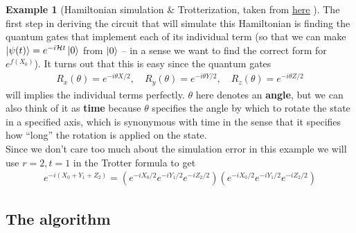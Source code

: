 \documentclass{book}
\theoremstyle{definition}
\newtheorem{exmp}{Example}[section]
\newcommand{\had}{\mathcal{H}}
\newcommand{\lp}{\left(}
\newcommand{\rp}{\right)}
\begin{document}
\begin{exmp}[Hamiltonian simulation \& Trotterization, taken from \href{https://vtomole.com/blog/2019/04/07/trotter}{\underline{here}} ]
	The first step in deriving the circuit that will simulate this Hamiltonian is finding the quantum gates that implement each of its individual term (so that we can make $\ket{\psi(t)}= e^{-i\had t}\ket{0}$ from $\ket{0}$ -- in a sense we want to find the correct form for $e^{f(X_0)}$). It turns out that this is easy since the quantum gates
	\begin{align}
	R_x(\theta) = e^{-i\theta X/2}, \quad R_y(\theta) = e^{-i\theta Y/2}, \quad R_z(\theta) = e^{-i\theta Z/2}
	\end{align} 
	will implies the individual terms perfectly. $\theta$ here denotes an \textbf{angle}, but we can also think of it as \textbf{time} because $\theta$ specifies the angle by which to rotate the state in a specified axis, which is synonymous with time in the sense that it specifies how ``long'' the rotation is applied on the state. \\
	
	
	Since we don't care too much about the simulation error in this example we will use  $r=2, t=1$ in the Trotter formula to get
	\begin{align}
	e^{-i(X_0 + Y_1 + Z_2)} = \lp e^{-iX_0/2}e^{-iY_1/2}e^{-iZ_2/2}\rp\lp e^{-iX_0/2}e^{-iY_1/2}e^{-iZ_2/2}  \rp
	\end{align}
\end{exmp}















\subsection{The algorithm}
\end{document}
